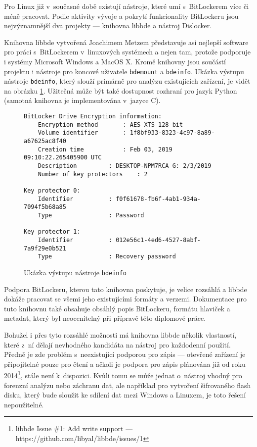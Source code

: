 
Pro Linux již v~současné době existují nástroje, které umí s~BitLockerem více či méně pracovat. Podle aktivity vývoje a pokrytí funkcionality BitLockeru jsou nejvýznamnější dva projekty --- knihovna libbde\cite{Metz2018} a nástroj Dislocker\cite{Coltel2017}.


Knihovna libbde vytvořená Joachimem Metzem představuje asi nejlepší software pro práci s~BitLockerem v~linuxových systémech a nejen tam, protože podporuje i systémy Microsoft Windows a MacOS X\cite{Metz2016}. Kromě knihovny jsou součástí projektu i nástroje pro koncové uživatele \texttt{bdemount} a \texttt{bdeinfo}. Ukázka výstupu nástroje \texttt{bdeinfo}, který slouží primárně pro analýzu existujících zařízení, je vidět na obrázku \ref{fig:libbde-bdeinfo}. Užitečná může být také dostupnost rozhraní pro jazyk Python (samotná knihovna je implementována v~jazyce C).

\begin{figure}[h]
		\centering
		\captionsetup{width=0.65\linewidth}
\begin{lstlisting}[frame=none, basicstyle=\ttfamily\small, columns=fullflexible, keepspaces=true]
BitLocker Drive Encryption information:
	Encryption method		: AES-XTS 128-bit
	Volume identifier		: 1f8bf933-8323-4c97-8a89-a67625ac8f40
	Creation time			: Feb 03, 2019 09:10:22.265405900 UTC
	Description			: DESKTOP-NPM7RCA G: 2/3/2019
	Number of key protectors	: 2

Key protector 0:
	Identifier			: f0f61678-fb6f-4ab1-934a-7094f5b68a85
	Type				: Password

Key protector 1:
	Identifier			: 012e56c1-4ed6-4527-8abf-7a9f29e0b521
	Type				: Recovery password
\end{lstlisting}
		\caption{Ukázka výstupu nástroje \texttt{bdeinfo}}
		\label{fig:libbde-bdeinfo}
\end{figure}

Podpora BitLockeru, kterou tato knihovna poskytuje, je velice rozsáhlá a libbde dokáže pracovat se všemi jeho existujícími formáty a verzemi. Dokumentace pro tuto knihovnu také obsahuje obsáhlý popis BitLockeru, formátu hlaviček a metadat\cite{Metz2011}, který byl neocenitelný při přípravě této diplomové práce.

Bohužel i přes tyto rozsáhlé možnosti má knihovna libbde několik vlastností, které z~ní dělají nevhodného kandidáta na nástroj pro každodenní použití. Předně je zde problém s~neexistující podporou pro zápis --- otevřené zařízení je připojitelné pouze pro čtení a ačkoli je podpora pro zápis plánována již od roku 2014\footnote{libbde Issue \#1: Add write support --- https://github.com/libyal/libbde/issues/1}, stále není k~dispozici. Kvůli tomu se může jednat o~nástroj vhodný pro forenzní analýzu nebo záchranu dat, ale například pro vytvoření šifrovaného flash disku, který bude sloužit ke sdílení dat mezi Windows a Linuxem, je toto řešení nepoužitelné.


